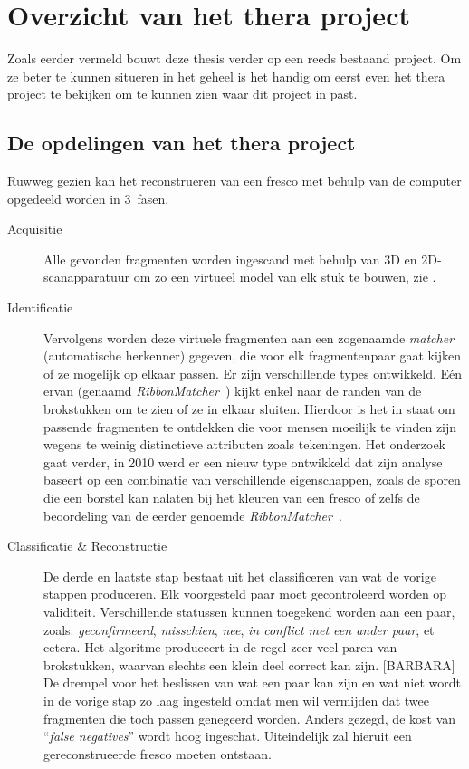 \chapter{Overzicht van het thera project}
\label{hoofdstuk:overzicht}
Zoals eerder vermeld bouwt deze thesis verder op een reeds bestaand project. Om ze beter te kunnen situeren in het geheel is het handig om eerst even het thera project te bekijken om te kunnen zien waar dit project in past.

\section{De opdelingen van het thera project}
Ruwweg gezien kan het reconstrueren van een fresco met behulp van de computer opgedeeld worden in 3~fasen.

\begin{description}
	\item[Acquisitie] Alle gevonden fragmenten worden ingescand met behulp van 3D en 2D-scanapparatuur om zo een virtueel model van elk stuk te bouwen, zie \cite{Brown2008}.  
	\item[Identificatie] Vervolgens worden deze virtuele fragmenten aan een zogenaamde \emph{matcher} (automatische herkenner) gegeven, die voor elk fragmentenpaar gaat kijken of ze mogelijk op elkaar passen. Er zijn verschillende types ontwikkeld. E\'en ervan (genaamd \emph{RibbonMatcher}~\cite{Brown2008}) kijkt enkel naar de randen van de brokstukken om te zien of ze in elkaar sluiten. Hierdoor is het in staat om passende fragmenten te ontdekken die voor mensen moeilijk te vinden zijn wegens te weinig distinctieve attributen zoals tekeningen. Het onderzoek gaat verder, in 2010 werd er een nieuw type ontwikkeld dat zijn analyse baseert op een combinatie van verschillende eigenschappen, zoals de sporen die een borstel kan nalaten bij het kleuren van een fresco of zelfs de beoordeling van de eerder genoemde \emph{RibbonMatcher}~\cite{TolerFranklin2010}.
	\item[Classificatie \& Reconstructie] De derde en laatste stap bestaat uit het classificeren van wat de vorige stappen produceren. Elk voorgesteld paar moet gecontroleerd worden op validiteit. Verschillende statussen kunnen toegekend worden aan een paar, zoals: \emph{geconfirmeerd}, \emph{misschien}, \emph{nee}, \emph{in conflict met een ander paar}, et cetera. Het algoritme produceert in de regel zeer veel paren van brokstukken, waarvan slechts een klein deel correct kan zijn. [BARBARA] De drempel voor het beslissen van wat een paar kan zijn en wat niet wordt in de vorige stap zo laag ingesteld omdat men wil vermijden dat twee fragmenten die toch passen genegeerd worden. Anders gezegd, de kost van ``\emph{false negatives}'' wordt hoog ingeschat. Uiteindelijk zal hieruit een gereconstrueerde fresco moeten ontstaan.
\end{description}


